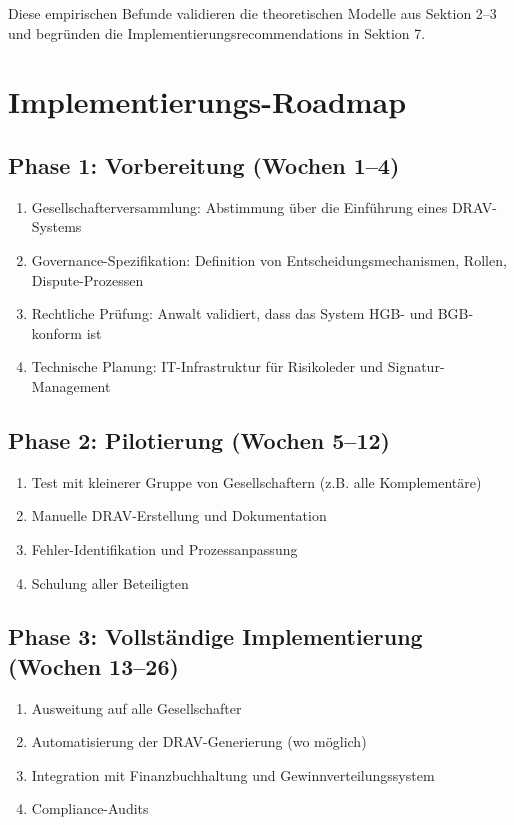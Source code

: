 \documentclass[a4paper,12pt]{article}
\theoremstyle{definition}
\begin{document}
Diese empirischen Befunde validieren die theoretischen Modelle aus Sektion 2--3 und begründen die Implementierungsrecommendations in Sektion 7.

\section{Implementierungs-Roadmap}

\subsection{Phase 1: Vorbereitung (Wochen 1--4)}

\begin{enumerate}
    \item Gesellschafterversammlung: Abstimmung über die Einführung eines DRAV-Systems
    \item Governance-Spezifikation: Definition von Entscheidungsmechanismen, Rollen, Dispute-Prozessen
    \item Rechtliche Prüfung: Anwalt validiert, dass das System HGB- und BGB-konform ist
    \item Technische Planung: IT-Infrastruktur für Risikoleder und Signatur-Management
\end{enumerate}

\subsection{Phase 2: Pilotierung (Wochen 5--12)}

\begin{enumerate}
    \item Test mit kleinerer Gruppe von Gesellschaftern (z.B. alle Komplementäre)
    \item Manuelle DRAV-Erstellung und Dokumentation
    \item Fehler-Identifikation und Prozessanpassung
    \item Schulung aller Beteiligten
\end{enumerate}

\subsection{Phase 3: Vollständige Implementierung (Wochen 13--26)}

\begin{enumerate}
    \item Ausweitung auf alle Gesellschafter
    \item Automatisierung der DRAV-Generierung (wo möglich)
    \item Integration mit Finanzbuchhaltung und Gewinnverteilungssystem
    \item Compliance-Audits
\end{enumerate}
\end{document}
